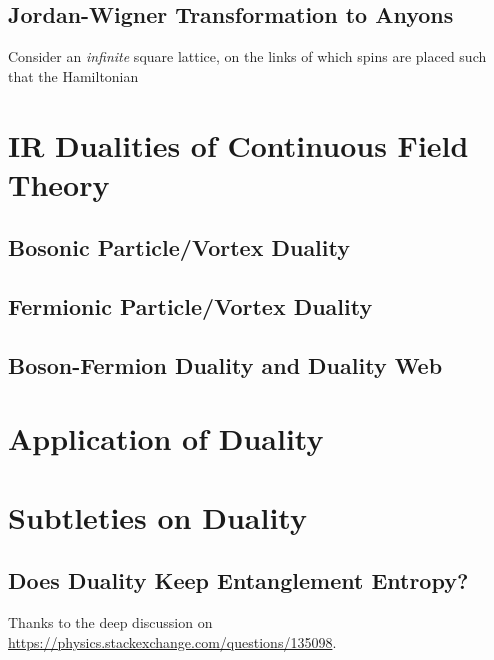 \documentclass[10pt,nofootinbib]{revtex4}
\numberwithin{equation}{section}
\begin{document}
	\subsection{Jordan-Wigner Transformation to Anyons}
		Consider an \emph{infinite} square lattice, on the links of which spins are placed such that the Hamiltonian

\section{IR Dualities of Continuous Field Theory}
	\subsection{Bosonic Particle/Vortex Duality}
	\subsection{Fermionic Particle/Vortex Duality}
	\subsection{Boson-Fermion Duality and Duality Web}

\section{Application of Duality}

\section{Subtleties on Duality}
	\subsection{Does Duality Keep Entanglement Entropy?}
		Thanks to the deep discussion on \url{https://physics.stackexchange.com/questions/135098}.


\end{document}

